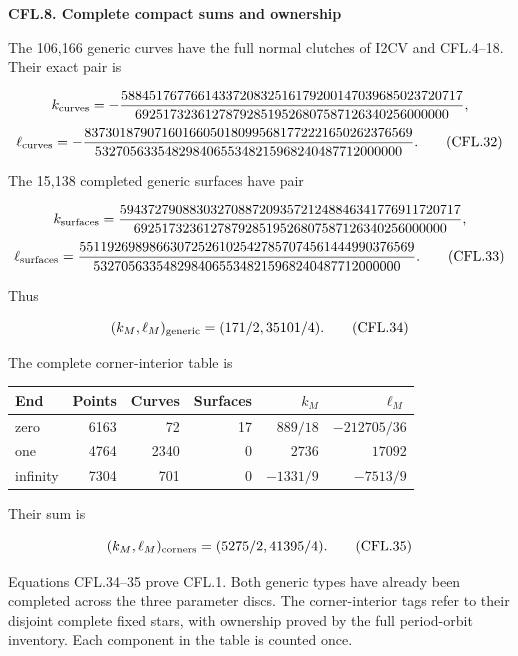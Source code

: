\par

\medskip\noindent\textbf{CFL.8. Complete compact sums and ownership}

\par\nobreak

The 106,166 generic curves have the full normal clutches
of I2CV and CFL.4--18. Their exact pair is

\[
 k_{\rm curves}=
 -\frac{5884517677661433720832516179200147039685023720717}
 {692517323612787928519526807587126340256000000},
\]
\[
 \ell_{\rm curves}=
 -\frac{83730187907160166050180995681772221650262376569}
 {53270563354829840655348215968240487712000000}.
 \tag{CFL.32}
\]

The 15,138 completed generic surfaces have pair

\[
 k_{\rm surfaces}=
 \frac{5943727908830327088720935721248846341776911720717}
 {692517323612787928519526807587126340256000000},
\]
\[
 \ell_{\rm surfaces}=
 \frac{551192698986630725261025427857074561444990376569}
 {53270563354829840655348215968240487712000000}.
 \tag{CFL.33}
\]

Thus

\[
                  (k_M,\ell_M)_{\rm generic}
                           =(171/2,35101/4).
 \tag{CFL.34}
\]

The complete corner-interior table is

\begin{longtable}[]{@{}lrrrrr@{}}
\toprule\noalign{}
End & Points & Curves & Surfaces & \(k_M\) & \(\ell_M\) \\
\midrule\noalign{}
\endhead
\bottomrule\noalign{}
\endlastfoot
zero & 6163 & 72 & 17 & \(889/18\) & \(-212705/36\) \\
one & 4764 & 2340 & 0 & \(2736\) & \(17092\) \\
infinity & 7304 & 701 & 0 & \(-1331/9\) & \(-7513/9\) \\
\end{longtable}

Their sum is

\[
                    (k_M,\ell_M)_{\rm corners}
                            =(5275/2,41395/4).
 \tag{CFL.35}
\]

Equations CFL.34--35 prove CFL.1. Both generic types
have already been completed across the three parameter
discs. The corner-interior tags refer to their disjoint
complete fixed stars, with ownership proved by the
full period-orbit inventory. Each component in the
table is counted once.

